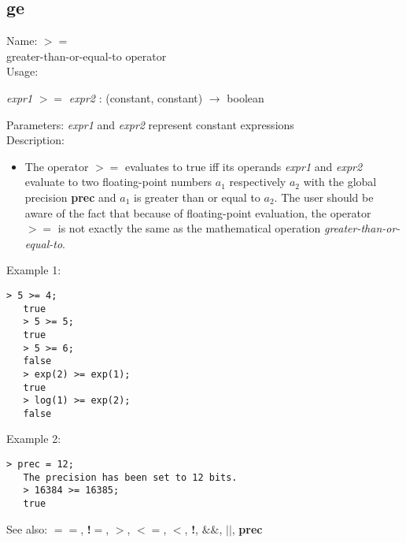 \subsection{ ge }
\noindent Name: \textbf{$>=$}\\
greater-than-or-equal-to operator\\

\noindent Usage: 
\begin{center}
\emph{expr1} \textbf{$>=$} \emph{expr2} : (\textsf{constant}, \textsf{constant}) $\rightarrow$ \textsf{boolean}\\
\end{center}
Parameters: 
\emph{expr1} and \emph{expr2} represent constant expressions\\

\noindent Description: \begin{itemize}

\item The operator \textbf{$>=$} evaluates to true iff its operands \emph{expr1} and
   \emph{expr2} evaluate to two floating-point numbers $a_1$
   respectively $a_2$ with the global precision \textbf{prec} and
   $a_1$ is greater than or equal to $a_2$. The user should
   be aware of the fact that because of floating-point evaluation, the
   operator \textbf{$>=$} is not exactly the same as the mathematical
   operation \emph{greater-than-or-equal-to}.
\end{itemize}
\noindent Example 1: 
\begin{center}\begin{minipage}{14.8cm}\begin{Verbatim}[frame=single]
   > 5 >= 4;
   true
   > 5 >= 5;
   true
   > 5 >= 6;
   false
   > exp(2) >= exp(1);
   true
   > log(1) >= exp(2);
   false
\end{Verbatim}
\end{minipage}\end{center}
\noindent Example 2: 
\begin{center}\begin{minipage}{14.8cm}\begin{Verbatim}[frame=single]
   > prec = 12;
   The precision has been set to 12 bits.
   > 16384 >= 16385;
   true
\end{Verbatim}
\end{minipage}\end{center}
See also: \textbf{$==$}, \textbf{!$=$}, \textbf{$>$}, \textbf{$<=$}, \textbf{$<$}, \textbf{!}, \textbf{$\&\&$}, \textbf{$||$}, \textbf{prec}
